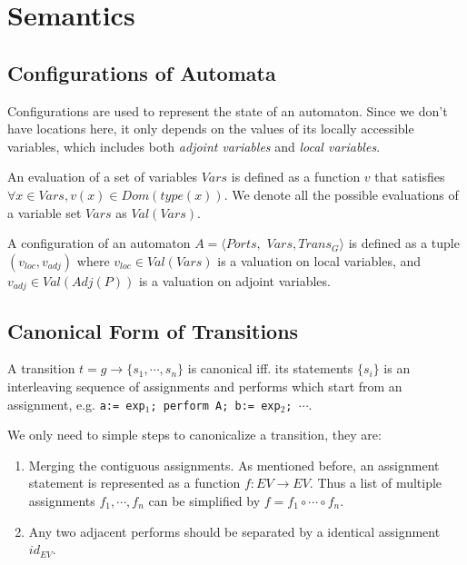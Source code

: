 \section{Semantics}
\label{sec:semantics}

\subsection{Configurations of Automata}
\label{subsec:config}
Configurations are used to represent the state of an automaton. Since we don't have locations here, it only depends on the values of its locally accessible variables, which includes both \emph{adjoint variables} and \emph{local variables}.

\begin{definition}[Valuation]
An evaluation of a set of variables $Vars$ is defined as a function $v$ that satisfies $\forall x\in Vars,v(x)\in Dom(type(x))$. We denote all the possible evaluations of a variable set $Vars$ as $Val(Vars)$.
\end{definition}

\begin{definition}[Configuration] A configuration of an automaton $A=\langle Ports,$ $Vars,Trans_G\rangle$ is defined as a tuple $(v_{loc},v_{adj})$ where $v_{loc}\in Val(Vars)$ is a valuation on local variables, and $v_{adj}\in Val(Adj(P))$ is a valuation on adjoint variables. 
\end{definition}

\subsection{Canonical Form of Transitions}
\label{subsec:canonical}

\begin{definition}
A transition $t=g\rightarrow\{s_1,\cdots,s_n\}$ is canonical iff. its statements $\{s_i\}$ is an interleaving sequence of assignments and performs which start from an assignment, e.g. \texttt{a:= exp$_1$; perform A; b:= exp$_2$; $\cdots$}.
\end{definition}
We only need to simple steps to canonicalize a transition, they are:
\begin{enumerate}
    \item Merging the contiguous assignments. As mentioned before, an assignment statement is represented as a function $f:EV\rightarrow EV$. Thus a list of multiple assignments $f_1,\cdots, f_n$ can be simplified by $f=f_1\circ\cdots \circ f_n$.
    \item Any two adjacent performs should be separated by a identical assignment $id_{EV}$. 
\end{enumerate}

